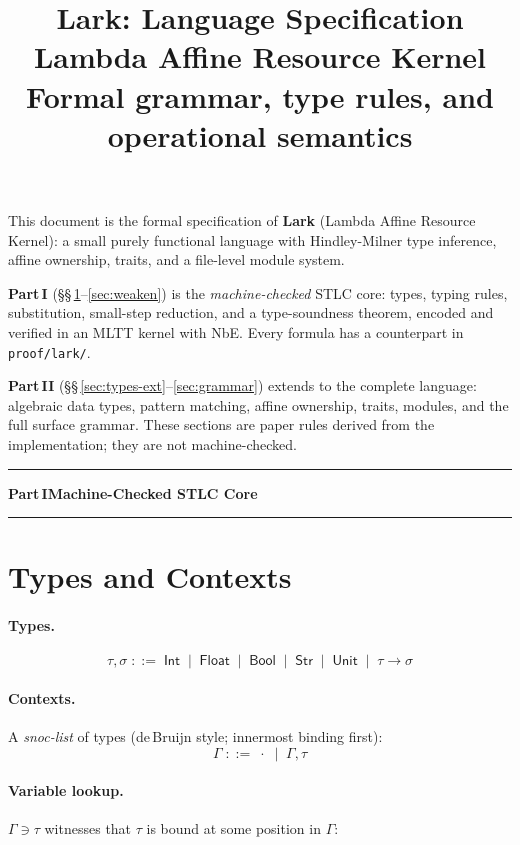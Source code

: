 \documentclass[10pt,a4paper]{article}
\title{\textbf{Lark: Language Specification}\\[6pt]
       \large Lambda Affine Resource Kernel\\[4pt]
       \normalsize Formal grammar, type rules, and operational semantics}
\author{}
\date{}
\newcommand{\TInt}{\mathsf{Int}}
\newcommand{\TFlt}{\mathsf{Float}}
\newcommand{\TBool}{\mathsf{Bool}}
\newcommand{\TStr}{\mathsf{Str}}
\newcommand{\TUnit}{\mathsf{Unit}}
\newcommand{\inctx}[2]{#1 \ni #2}               %
\theoremstyle{plain}
\theoremstyle{definition}
\theoremstyle{remark}
\begin{document}
\maketitle\thispagestyle{empty}

\noindent
This document is the formal specification of \textbf{Lark} (Lambda Affine
Resource Kernel): a small purely functional language with Hindley-Milner type
inference, affine ownership, traits, and a file-level module system.

\smallskip
\noindent\textbf{Part\,I} (\S\S\,\ref{sec:types}--\ref{sec:weaken}) is the
\emph{machine-checked} STLC core: types, typing rules, substitution, small-step
reduction, and a type-soundness theorem, encoded and verified in an MLTT kernel
with NbE.  Every formula has a counterpart in \texttt{proof/lark/}.

\smallskip
\noindent\textbf{Part\,II} (\S\S\,\ref{sec:types-ext}--\ref{sec:grammar})
extends to the complete language: algebraic data types, pattern matching, affine
ownership, traits, modules, and the full surface grammar.  These sections are
paper rules derived from the implementation; they are not machine-checked.

\medskip\noindent\rule{\linewidth}{0.4pt}
{\centering\normalsize\bfseries Part\,I\quad Machine-Checked STLC Core\par}
\noindent\rule{\linewidth}{0.4pt}\medskip

\section{Types and Contexts}
\label{sec:types}

\paragraph{Types.}
\[
\tau,\sigma \;::=\; \TInt \;\mid\; \TFlt \;\mid\; \TBool \;\mid\; \TStr
            \;\mid\; \TUnit \;\mid\; \tau \to \sigma
\]

\paragraph{Contexts.}
A \emph{snoc-list} of types (de\,Bruijn style; innermost binding first):
\[
\Gamma \;::=\; \cdot \;\mid\; \Gamma,\tau
\]

\paragraph{Variable lookup.}
$\inctx{\Gamma}{\tau}$ witnesses that $\tau$ is bound at some position in $\Gamma$:
\end{document}
